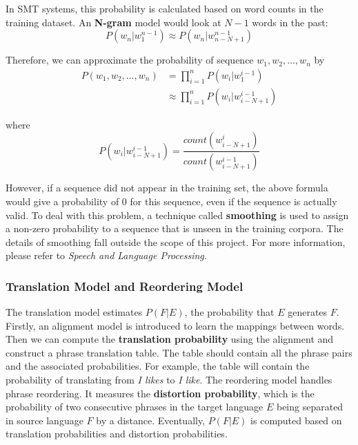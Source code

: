 \documentclass[12pt,a4paper,twoside,openright]{report}
\begin{document}
In SMT systems, this probability is calculated based on word counts in the training dataset. An \textbf{N-gram} model would look at $N-1$ words in the past:
\begin{equation*}
P(w_n|w_1^{n-1}) \approx P(w_n|w_{n-N+1}^{n-1})
\end{equation*}

Therefore, we can approximate the probability of sequence $w_1, w_2, \dots, w_n$ by
\begin{equation*}
\begin{split}
P(w_1, w_2, \dots, w_n) & = \prod_{i=1}^{n}P(w_i|w_1^{i-1})\\
 & \approx \prod_{i=1}^{n}P(w_i|w_{i-N+1}^{i-1})
\end{split}
\end{equation*}

where
\begin{equation*}
P(w_i|w_{i-N+1}^{i-1}) = \frac{count(w_{i-N+1}^i)}{count(w_{i-N+1}^{i-1})}
\end{equation*}

However, if a sequence did not appear in the training set, the above formula would give a probability of 0 for this sequence, even if the sequence is actually valid. To deal with this problem, a technique called \textbf{smoothing} is used to assign a non-zero probability to a sequence that is unseen in the training corpora. The details of smoothing fall outside the scope of this project. For more information, please refer to \textit{Speech and Language Processing}\cite{Jurafsky:2009:SLP:1214993}.

\subsubsection{Translation Model and Reordering Model}
The translation model estimates $P(F|E)$,  the probability that $E$ generates $F$. Firstly, an alignment model is introduced to learn the mappings between words. Then we can compute the \textbf{translation probability} using the alignment and construct a phrase translation table. The table should contain all the phrase pairs and the associated probabilities. For example, the table will contain the probability of translating from \textit{I likes} to \textit{I like}. The reordering model handles phrase reordering. It measures the \textbf{distortion probability}, which is the probability of two consecutive phrases in the target language $E$ being separated in source language $F$ by a distance. Eventually, $P(F|E)$ is computed based on translation probabilities and distortion probabilities.
\end{document}
